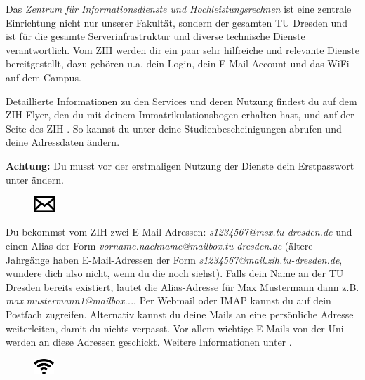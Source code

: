 
Das \textit{Zentrum für Informationsdienste und Hochleistungsrechnen} ist eine zentrale Einrichtung nicht nur unserer Fakultät, sondern der gesamten TU Dresden und ist für die gesamte Serverinfrastruktur und diverse technische Dienste verantwortlich. Vom ZIH werden dir ein paar sehr hilfreiche und relevante Dienste bereitgestellt, dazu gehören u.a. dein Login, dein E-Mail-Account und das WiFi auf dem Campus.

Detaillierte Informationen zu den Services und deren Nutzung findest du auf dem ZIH Flyer, den du mit deinem Immatrikulationsbogen erhalten hast, und auf der Seite des ZIH . So kannst du unter  deine Studienbescheinigungen abrufen und deine Adressdaten ändern.

\textbf{Achtung:} Du musst vor der erstmaligen Nutzung der Dienste dein Erstpasswort unter  ändern.


\begin{figure}%
  \vspace{-0.4cm}%
  \centering%
  \includegraphics[height=0.6cm]{img/icons/email.pdf}%
  \vspace{-0.4cm}%
\end{figure}

Du bekommst vom ZIH zwei E-Mail-Adressen:
\textit{s1234567@msx.tu-dresden.de} und einen Alias der Form \textit{vorname.nachname@mailbox.tu-dresden.de}
(ältere Jahrgänge haben E-Mail-Adressen der Form \textit{s1234567\allowbreak @mail.zih.tu-dresden.de}, wundere dich also nicht, wenn du die noch siehst).
Falls dein Name an der TU Dresden bereits existiert, lautet die Alias-Adresse für Max Mustermann dann z.B. \textit{max.mustermann1@mailbox...}.
Per Webmail oder IMAP kannst du auf dein Postfach zugreifen.
Alternativ kannst du deine Mails an eine persönliche Adresse weiterleiten, damit du nichts verpasst.
Vor allem wichtige E-Mails von der Uni werden an diese Adressen geschickt. Weitere Informationen unter .


\begin{figure}%
  \vspace{-0.4cm}%
  \centering%
  \includegraphics[height=0.6cm]{img/icons/wifi.pdf}%
  \vspace{-0.4cm}%
\end{figure}

